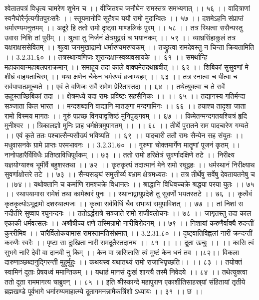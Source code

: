 श्वेतातपत्रं विधृत्य चामरेण शुभेन च ।।
वीजितश्च जनौघेन रामस्तत्र समभ्यगात् ।। ५६ ।।
वादित्राणां स्वनैघोरैर्नृत्यगीतपुरःसरैः ।।
स्तूयमानोपि सूतैश्च ययौ रामो मुदान्वितः ।। ५७ ।।
दशमेऽहनि संप्राप्तं धर्मारण्यमनुत्तमम् ।।
अदूरे हि ततो रामो दृष्ट्वा माण्डलिकं पुरम् ।। ५८ ।।
तत्र स्थित्वा ससैन्यस्तु उवास निशि तां पुरीम् ।।
श्रुत्वा तु निर्जनं क्षेत्रमुद्वसं च भयानकम् ।। ५९ ।।
व्याघ्रसिंहाकुलं तत्र यक्षराक्षससेवितम् ।।
श्रुत्वा जनमुखाद्रामो धर्मारण्यमरण्यकम् ।।
तच्छ्रुत्वा रामदेवस्तु न चिन्ता क्रियतामिति ।। 3.2.31.६० ।।
तत्रस्थान्वणिजः शूरान्दक्षान्स्वव्यवसायके ।। ६१ ।।
समर्थान्हि महाकायान्महाबलपराक्रमान् ।।
समाहूय तदा काले वाक्यमेतदथाब्रवीत् ।। ६२ ।।
शिबिकां सुसुवणां मे शीघ्रं वाहयताचिरम् ।।
यथा क्षणेन चैकेन धर्मरण्यं व्रजाम्यहम् ।। ६३ ।।
तत्र स्नात्वा च पीत्वा च सर्वपापात्प्रमुच्यते ।।
एवं ते वणिजः सर्वै रामेण प्रेरितास्तदा ।। ६४ ।।
तथेत्युक्त्वा च ते सर्वे ऊहुस्तच्छिबिकां तदा ।।
क्षेत्रमध्ये यदा रामः प्रविष्टः सहसैनिकः ।। ।। ६५ ।।
तद्यानस्य गतिर्मन्दा सञ्जाता किल भारत ।।
मन्दशब्दानि वाद्यानि मातङ्गा मन्दगामिनः ।। ६६ ।।
हयाश्च तादृशा जाता रामो विस्मय मागतः ।।
गुरुं पप्रच्छ विनयाद्वशिष्ठं मुनिपुङ्गवम् ।। ६७ ।।
किमेतन्मन्दगतयश्चित्रं हृदि मुनीश्वर ।।
त्रिकालज्ञो मुनिः प्राह धर्मक्षेत्रमुपागतम् ।। ।। ६८ ।।
तीर्थे पुरातने राम पादचारेण गम्यते ।।
एवं कृते ततः पश्चात्सैन्यसौख्यं भविष्यति ।। ६९ ।।
पादचारी ततौ रामः सैन्येन सह संयुतः ।।
मधुवासनके ग्रामे प्राप्तः परमभावनः ।। 3.2.31.७० ।।
गुरुणा चोक्तमार्गेण मातॄणां पूजनं कृतम् ।।
नानोपहारैर्विविधैः प्रतिष्ठाविधिपूर्वकम् ।। ७३ ।।
ततो रामो हरिक्षेत्रं सुवर्णादक्षिणे तटे ।।
निरीक्ष्य यज्ञयोग्याश्च भूमीर्वै बहुशस्तथा ।। ७२ ।।
कृतकृत्यं तदात्मानं मेने रामो रघूद्वहः ।।
धर्मस्थानं निरीक्ष्याथ सुवर्णाक्षोत्तरे तटे ।। ७३ ।।
सैन्यसङ्घं समुत्तीर्य्य बभ्राम क्षेत्रमध्यतः ।।
तत्र तीर्थेषु सर्वेषु देवतायतनेषु च ।।७४।।
यथोक्तानि च कर्माणि रामश्चक्रे विधानतः ।।
श्राद्धानि विधिवच्चक्रे श्रद्धया परया युतः ।। ७५ ।।
स्थापयामास रामेशं तथा कामेश्वरं पुनः ।।
स्थानाद्वायुप्रदेशे तु सुवर्णो भयतस्तटे ।। ७६ ।।
कृत्वैवं कृतकृत्योऽभूद्रामो दशरथात्मजः ।।
कृत्वा सर्वविधिं चैव सभायां समुपाविशत् ।। ७७ ।।
तां निशां स नदीतीरे सुष्वाप रघुनन्दनः ।।
ततोऽर्द्धरात्रे सञ्जाते रामो राजीवलोचनः ।। ७८ ।।
जागृतस्तु तदा काल एकाकी धर्मवत्सलः ।।
अश्रौषीच्च क्षणे तस्मिन्रामो नारीविरोदनम् ।। ७९ ।।
निशायां करुणैर्वाक्यै रुदन्तीं कुररीमिव ।।
चारैर्विलोकयामास रामस्तामतिसंभ्रमात् ।। 3.2.31.८० ।।
दृष्ट्वातिविह्वलां नारीं क्रन्दन्तीं करुणैः स्वरैः ।।
पृष्टा सा दुःखिता नारी रामदूतैस्तदानघ ।। ८१ ।।
।। दूता ऊचुः ।। ।।
कासि त्वं सुभगे नारि देवी वा दानवी नु किम् ।।
केन वा त्रासितासि त्वं मुष्टं केन धनं तव ।।८२।।
विकला दारुणाञ्छब्दानुद्गिरन्ती मुहुर्मुहुः ।।
कथयस्व यथातथ्यं रामो राजाभिपृच्छति।। ।। ८३ ।।
तयोक्तं स्वामिनं दूताः प्रेषयध्वं ममान्तिकम् ।।
यथाहं मानसं दुःखं शान्त्यै तस्मै निवेदये ।। ८४ ।।
तथेत्युक्त्वा ततो दूता राममागत्य चाब्रुवन् ।। ८५ ।।
इति श्रीस्कान्दे महापुराण एकाशीतिसाहस्र्यां संहितायां तृतीये ब्रह्मखण्डे पूर्वभागे धर्मारण्यमाहात्म्ये दूतागमनन्नामैकत्रिंशो ऽध्यायः ।। ३१ ।। छ ।।

